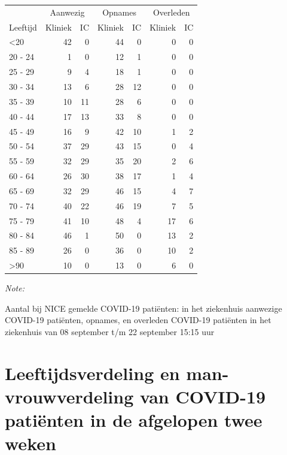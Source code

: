 \documentclass[
  english,
  man,floatsintext]{apa6}
\begin{document}
\begin{table}
\centering\begingroup\fontsize{10}{12}\selectfont

\begin{threeparttable}
\begin{tabular}{lrrrrrr}
\toprule
\multicolumn{1}{c}{ } & \multicolumn{2}{c}{Aanwezig} & \multicolumn{2}{c}{Opnames} & \multicolumn{2}{c}{Overleden} \\
\cmidrule(l{3pt}r{3pt}){2-3} \cmidrule(l{3pt}r{3pt}){4-5} \cmidrule(l{3pt}r{3pt}){6-7}
Leeftijd & Kliniek & IC & Kliniek & IC & Kliniek & IC\\
\midrule
<20 & 42 & 0 & 44 & 0 & 0 & 0\\
20 - 24 & 1 & 0 & 12 & 1 & 0 & 0\\
25 - 29 & 9 & 4 & 18 & 1 & 0 & 0\\
30 - 34 & 13 & 6 & 28 & 12 & 0 & 0\\
35 - 39 & 10 & 11 & 28 & 6 & 0 & 0\\
40 - 44 & 17 & 13 & 33 & 8 & 0 & 0\\
45 - 49 & 16 & 9 & 42 & 10 & 1 & 2\\
50 - 54 & 37 & 29 & 43 & 15 & 0 & 4\\
55 - 59 & 32 & 29 & 35 & 20 & 2 & 6\\
60 - 64 & 26 & 30 & 38 & 17 & 1 & 4\\
65 - 69 & 32 & 29 & 46 & 15 & 4 & 7\\
70 - 74 & 40 & 22 & 46 & 19 & 7 & 5\\
75 - 79 & 41 & 10 & 48 & 4 & 17 & 6\\
80 - 84 & 46 & 1 & 50 & 0 & 13 & 2\\
85 - 89 & 26 & 0 & 36 & 0 & 10 & 2\\
>90 & 10 & 0 & 13 & 0 & 6 & 0\\
\bottomrule
\end{tabular}
\begin{tablenotes}
\item \textit{Note: } 
\item Aantal bij NICE gemelde COVID-19 patiënten: in het ziekenhuis aanwezige COVID-19 patiënten, opnames, en overleden COVID-19 patiënten in het ziekenhuis van 08 september t/m 22 september 15:15 uur
\end{tablenotes}
\end{threeparttable}
\endgroup{}
\end{table}

\newpage

\hypertarget{leeftijdsverdeling-en-man-vrouwverdeling-van-covid-19-patiuxebnten-in-de-afgelopen-twee-weken}{%
\section{Leeftijdsverdeling en man-vrouwverdeling van COVID-19 patiënten in de afgelopen twee weken}\label{leeftijdsverdeling-en-man-vrouwverdeling-van-covid-19-patiuxebnten-in-de-afgelopen-twee-weken}}
\end{document}
